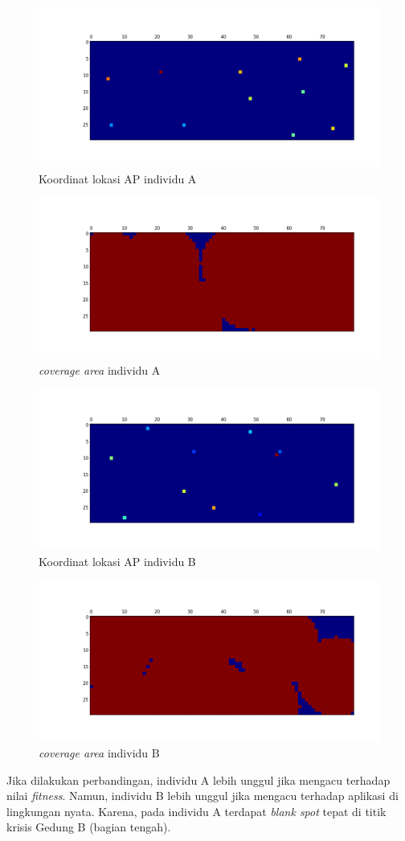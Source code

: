 \documentclass[12pt,a4paper]{report}
\begin{document}
		\begin{figure}[h]
			\centering
			\includegraphics[width=0.5\linewidth]{apLoc_02}
			\caption{Koordinat lokasi AP individu A}
			\label{fig:apLoc_02}
		\end{figure}	
		
		\begin{figure}[h]
			\centering
			\includegraphics[width=0.5\linewidth]{coverage_02}
			\caption{\emph{coverage area} individu A}
			\label{fig:coverage_02}
		\end{figure}
		
		\begin{figure}[h]
		\centering
		\includegraphics[width=0.5\linewidth]{apLoc_05}
		\caption{Koordinat lokasi AP individu B}
		\label{fig:apLoc_05}
		\end{figure}
		
		\begin{figure}[h]
		\centering
		\includegraphics[width=0.5\linewidth]{coverage_05}
		\caption{\emph{coverage area} individu B}
		\label{fig:coverage_05}
		\end{figure}
		
		Jika dilakukan perbandingan, individu A lebih unggul jika mengacu terhadap nilai \emph{fitness}. Namun, individu B lebih unggul jika mengacu terhadap aplikasi di lingkungan nyata. Karena, pada individu A terdapat \emph{blank spot} tepat di titik krisis Gedung B (bagian tengah).
\end{document}
